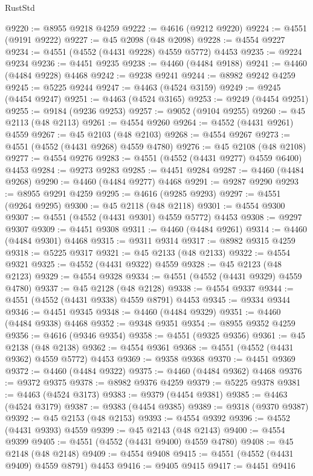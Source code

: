 \begin{lexlean}{RustStd}
\begin{coremodule}
@9220 := @8955 @9218 @4259
@9222 := @4616 (@9212 @9220)
@9224 := @4551 (@9191 @9222)
@9227 := @45 @2098 (@48 @2098)
@9228 := @4554 @9227
@9234 := @4551 (@4552 (@4431 @9228) @4559 @5772) @4453
@9235 := @9224 @9234
@9236 := @4451 @9235
@9238 := @4460 (@4484 @9188)
@9241 := @4460 (@4484 @9228) @4468
@9242 := @9238 @9241
@9244 := @8982 @9242 @4259
@9245 := @5225 @9244
@9247 := @4463 (@4524 @3159)
@9249 := @9245 (@4454 @9247)
@9251 := @4463 (@4524 @3165)
@9253 := @9249 (@4454 @9251)
@9255 := @9184 (@9236 @9253)
@9257 := @9052 (@9104 @9255)
@9260 := @45 @2113 (@48 @2113)
@9261 := @4554 @9260
@9264 := @4552 (@4431 @9261) @4559
@9267 := @45 @2103 (@48 @2103)
@9268 := @4554 @9267
@9273 := @4551 (@4552 (@4431 @9268) @4559 @4780)
@9276 := @45 @2108 (@48 @2108)
@9277 := @4554 @9276
@9283 := @4551 (@4552 (@4431 @9277) @4559 @6400) @4453
@9284 := @9273 @9283
@9285 := @4451 @9284
@9287 := @4460 (@4484 @9268)
@9290 := @4460 (@4484 @9277) @4468
@9291 := @9287 @9290
@9293 := @8955 @9291 @4259
@9295 := @4616 (@9285 @9293)
@9297 := @4551 (@9264 @9295)
@9300 := @45 @2118 (@48 @2118)
@9301 := @4554 @9300
@9307 := @4551 (@4552 (@4431 @9301) @4559 @5772) @4453
@9308 := @9297 @9307
@9309 := @4451 @9308
@9311 := @4460 (@4484 @9261)
@9314 := @4460 (@4484 @9301) @4468
@9315 := @9311 @9314
@9317 := @8982 @9315 @4259
@9318 := @5225 @9317
@9321 := @45 @2133 (@48 @2133)
@9322 := @4554 @9321
@9325 := @4552 (@4431 @9322) @4559
@9328 := @45 @2123 (@48 @2123)
@9329 := @4554 @9328
@9334 := @4551 (@4552 (@4431 @9329) @4559 @4780)
@9337 := @45 @2128 (@48 @2128)
@9338 := @4554 @9337
@9344 := @4551 (@4552 (@4431 @9338) @4559 @8791) @4453
@9345 := @9334 @9344
@9346 := @4451 @9345
@9348 := @4460 (@4484 @9329)
@9351 := @4460 (@4484 @9338) @4468
@9352 := @9348 @9351
@9354 := @8955 @9352 @4259
@9356 := @4616 (@9346 @9354)
@9358 := @4551 (@9325 @9356)
@9361 := @45 @2138 (@48 @2138)
@9362 := @4554 @9361
@9368 := @4551 (@4552 (@4431 @9362) @4559 @5772) @4453
@9369 := @9358 @9368
@9370 := @4451 @9369
@9372 := @4460 (@4484 @9322)
@9375 := @4460 (@4484 @9362) @4468
@9376 := @9372 @9375
@9378 := @8982 @9376 @4259
@9379 := @5225 @9378
@9381 := @4463 (@4524 @3173)
@9383 := @9379 (@4454 @9381)
@9385 := @4463 (@4524 @3179)
@9387 := @9383 (@4454 @9385)
@9389 := @9318 (@9370 @9387)
@9392 := @45 @2153 (@48 @2153)
@9393 := @4554 @9392
@9396 := @4552 (@4431 @9393) @4559
@9399 := @45 @2143 (@48 @2143)
@9400 := @4554 @9399
@9405 := @4551 (@4552 (@4431 @9400) @4559 @4780)
@9408 := @45 @2148 (@48 @2148)
@9409 := @4554 @9408
@9415 := @4551 (@4552 (@4431 @9409) @4559 @8791) @4453
@9416 := @9405 @9415
@9417 := @4451 @9416

\end{coremodule}
\end{lexlean}
